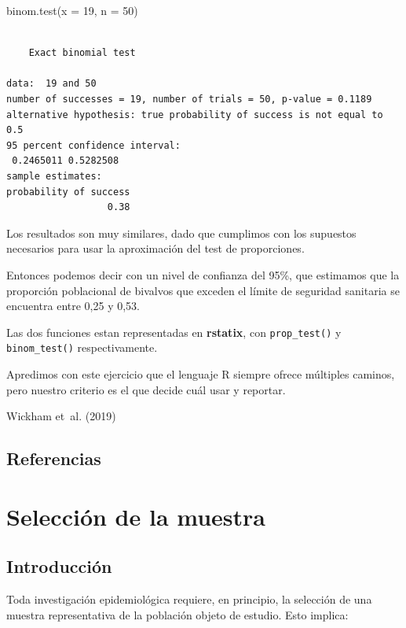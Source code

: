 \documentclass[
  spanish,
  a4paper,
]{scrbook}
\newenvironment{Shaded}{\begin{snugshade}}{\end{snugshade}}
\newcommand{\AttributeTok}[1]{\textcolor[rgb]{0.40,0.45,0.13}{#1}}
\newcommand{\DecValTok}[1]{\textcolor[rgb]{0.68,0.00,0.00}{#1}}
\newcommand{\FunctionTok}[1]{\textcolor[rgb]{0.28,0.35,0.67}{#1}}
\newcommand{\NormalTok}[1]{\textcolor[rgb]{0.00,0.23,0.31}{#1}}
\begin{document}
\begin{Shaded}
\begin{Highlighting}[]
\FunctionTok{binom.test}\NormalTok{(}\AttributeTok{x =} \DecValTok{19}\NormalTok{, }\AttributeTok{n =} \DecValTok{50}\NormalTok{)}
\end{Highlighting}
\end{Shaded}

\begin{verbatim}

    Exact binomial test

data:  19 and 50
number of successes = 19, number of trials = 50, p-value = 0.1189
alternative hypothesis: true probability of success is not equal to 0.5
95 percent confidence interval:
 0.2465011 0.5282508
sample estimates:
probability of success 
                  0.38 
\end{verbatim}

Los resultados son muy similares, dado que cumplimos con los supuestos
necesarios para usar la aproximación del test de proporciones.

Entonces podemos decir con un nivel de confianza del 95\%, que estimamos
que la proporción poblacional de bivalvos que exceden el límite de
seguridad sanitaria se encuentra entre 0,25 y 0,53.

Las dos funciones estan representadas en \textbf{rstatix}, con
\texttt{prop\_test()} y \texttt{binom\_test()} respectivamente.

Apredimos con este ejercicio que el lenguaje R siempre ofrece múltiples
caminos, pero nuestro criterio es el que decide cuál usar y reportar.

Wickham et~al. (2019)

\section{Referencias}\label{referencias-7}

\chapter{Selección de la muestra}\label{selecciuxf3n-de-la-muestra}

\section{Introducción}\label{introducciuxf3n-7}

Toda investigación epidemiológica requiere, en principio, la selección
de una muestra representativa de la población objeto de estudio. Esto
implica:
\end{document}
